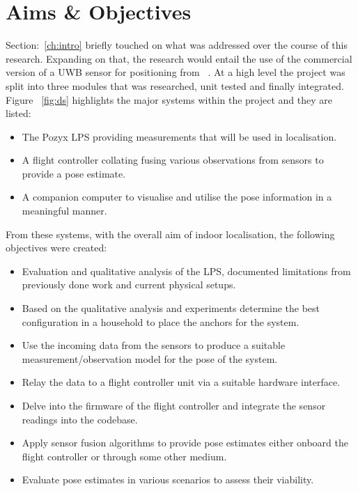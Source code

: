 \section{Aims \& Objectives}\label{sec:aims_objs}

Section:~\ref{ch:intro} briefly touched on what was addressed over the course of this research.
Expanding on that, the research would entail the use of the commercial version of a UWB sensor for positioning from ~\cite{pozyx2018pozyx}.
At a high level the project was split into three modules that was researched, unit tested and finally integrated.
Figure ~\ref{fig:ds} highlights the major systems within the project and they are listed:
\begin{itemize}
    \item The Pozyx LPS providing measurements that will be used in localisation.
    \item A flight controller collating fusing various observations from sensors to provide a pose estimate.
    \item A companion computer to visualise and utilise the pose information in a meaningful manner.
\end{itemize}

From these systems, with the overall aim of indoor localisation, the following objectives were created:
\begin{itemize}
    \item Evaluation and qualitative analysis of the LPS, documented limitations from previously done work and current physical setups.
    \item Based on the qualitative analysis and experiments determine the best configuration in a household to place the anchors for the system.
    \item Use the incoming data from the sensors to produce a suitable measurement/observation model for the pose of the system.
    \item Relay the data to a flight controller unit via a suitable hardware interface.
    \item Delve into the firmware of the flight controller and integrate the sensor readings into the codebase.
    \item Apply sensor fusion algorithms to provide pose estimates either onboard the flight controller or through some other medium.
    \item Evaluate pose estimates in various scenarios to assess their viability.
\end{itemize}

